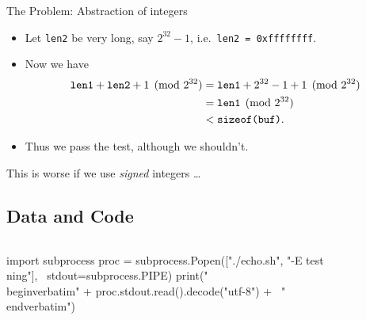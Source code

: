 \begin{frame}[fragile]
  \inputminted{C}{combine.c}
\end{frame}

\begin{frame}
  \begin{alertblock}{The Problem: Abstraction of integers}
    \begin{itemize}
      \item Let \texttt{len2} be very long, say \(2^{32} - 1\), i.e.\ 
        \texttt{len2 = 0xffffffff}.

      \item Now we have
        \begin{align*}
          \text{\texttt{len1}} + \text{\texttt{len2}} 
          + 1 \pmod{2^{32}}
          &= \text{\texttt{len1}} + 2^{32} - 1 + 1 \pmod{2^{32}} \\
          &= \text{\texttt{len1}} \pmod{2^{32}} \\
          &< \text{\texttt{sizeof(buf)}}.
        \end{align*}

      \item Thus we pass the test, although we shouldn't.
    \end{itemize}
  \end{alertblock}
\end{frame}

\begin{frame}
  \begin{remark}
    This is worse if we use \emph{signed} integers \dots
  \end{remark}
\end{frame}

\subsection{Data and Code}

\begin{frame}[fragile]
  \begin{example}
    \inputminted{sh}{echo.sh}
    \begin{pycode}[echo.sh]
import subprocess
proc = subprocess.Popen(["./echo.sh", "-E test\\ning"], \
stdout=subprocess.PIPE)
print("\\begin{verbatim}" + proc.stdout.read().decode("utf-8") + \
"\\end{verbatim}")
    \end{pycode}
  \end{example}
\end{frame}


